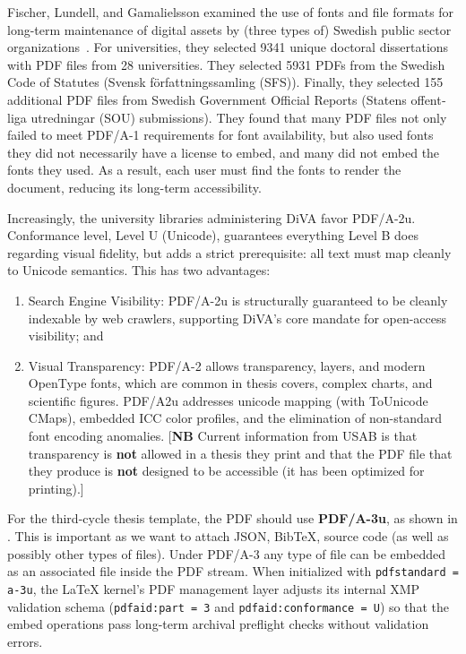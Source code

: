 \documentclass[12pt, twoside]{article}
\begin{document}
Fischer, Lundell, and Gamalielsson examined the use of fonts and file formats for long-term maintenance of digital assets by (three types of) Swedish public sector organizations~\cite{fischer_pdfconformance_2023}. For universities, they selected \num{9341} unique doctoral dissertations with \gls{PDF} files from 28 universities. They selected \num{5931} \glspl{PDF} from the Swedish Code of
Statutes (\foreignlanguage{swedish}{Svensk författningssamling} (SFS)). Finally, they selected \num{155} additional \gls{PDF} files from Swedish Government Official Reports (\foreignlanguage{swedish}{Statens offentliga utredningar} (SOU) submissions). They found that many \gls{PDF} files not only failed to meet PDF/A-1 requirements for font availability, but also used fonts they did not necessarily have a license to embed, and many did not embed the fonts they used. As a result, each user must find the fonts to render the document, reducing its long-term accessibility.

Increasingly, the university libraries administering \gls{DiVA} favor PDF/A-2u. Conformance level, \ie Level U (Unicode), guarantees everything Level B does regarding visual fidelity, but adds a strict prerequisite: all text must map cleanly to Unicode semantics. This has two advantages:
\begin{enumerate}
    \item Search Engine Visibility: PDF/A-2u is structurally guaranteed to be cleanly indexable by web crawlers, supporting DiVA's core mandate for open-access visibility; and
    
    \item Visual Transparency: PDF/A-2 allows transparency, layers, and modern OpenType fonts, which are common in thesis covers, complex charts, and scientific figures. PDF/A2u addresses unicode mapping (with ToUnicode CMaps), embedded ICC color profiles, and the elimination of non-standard font encoding anomalies. [\textbf{NB} Current information from USAB is that transparency is \textbf{not} allowed in a thesis they print and that the \gls{PDF} file that they produce is \textbf{not} designed to be accessible (\ie it has been optimized for printing).]
\end{enumerate}

For the third-cycle thesis template, the \gls{PDF} should use \textbf{PDF/A-3u}, as shown in . This is important as we want to attach JSON, BibTeX, source code (as well as possibly other types of files). Under PDF/A-3 any type of file can be embedded as an associated file inside the PDF stream.
When initialized with \texttt{pdfstandard = a-3u}, the \LaTeX{} kernel's \gls{PDF} management layer adjusts its internal \gls{XMP} validation schema (\texttt{pdfaid:part = 3} and \texttt{pdfaid:conformance = U}) so that the embed operations pass long-term archival preflight checks without validation errors.
\end{document}
